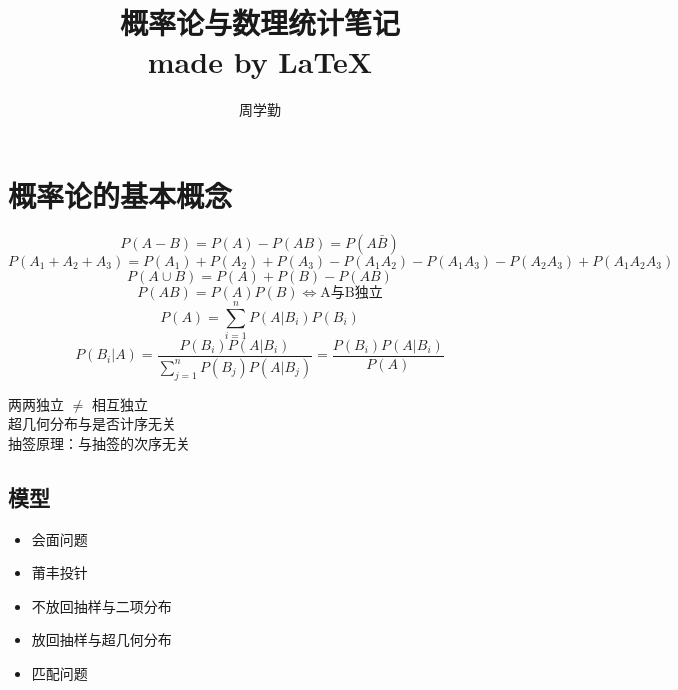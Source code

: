 \documentclass{article}
\title{\Huge 概率论与数理统计笔记    \\\large made by  \LaTeX}
\author{周学勤}
\begin{document}
 
\maketitle
\clearpage
\section*{\center\Huge 概率论的基本概念}
\begin{large}
\begin{tcolorbox}
    [colback=Emerald!10,colframe=cyan!40!black,title=\textbf{公式}]
    \[P(A-B)=P(A)-P(AB)=P(A\bar{B})\]
    \[P(A_1+A_2+A_3)=P(A_1)+P(A_2)+P(A_3)-P(A_1A_2)-P(A_1A_3)-P(A_2A_3)+P(A_1A_2A_3)\]
    \[P(A\cup B)=P(A)+P(B)-P(AB)\]
    \[P(AB)=P(A)P(B)\Longleftrightarrow \mbox{A与B独立}\]
    \[P(A)=\sum_{i=1}^{n}P(A|B_i)P(B_i)\]
    \[P(B_i|A)=\frac{P(B_i)P(A|B_i)}{\sum_{j=1}^{n}P(B_j)P(A|B_j)}=\frac{P(B_i)P(A|B_i)}{P(A)}\]
\end{tcolorbox}
\end{large}

\begin{tcolorbox}
    [colback=brownshade,colframe=Sepia,title=\textbf{概念}]
    两两独立 $\neq$ 相互独立\\
    超几何分布与是否计序无关\\
    抽签原理：与抽签的次序无关
\end{tcolorbox}
\subsection*{模型}

\begin{itemize}
    \item 会面问题
    \item 莆丰投针
    \item 不放回抽样与二项分布
    \item 放回抽样与超几何分布
    \item 匹配问题
\end{itemize}
\clearpage
 
\end{document}
